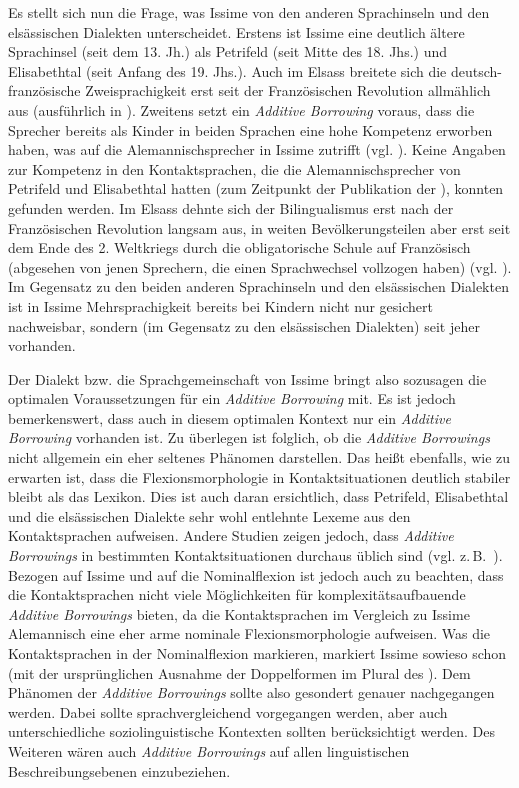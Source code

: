 Es stellt sich nun die Frage, was Issime von den anderen Sprachinseln und den elsässischen Dialekten unterscheidet. Erstens ist Issime eine deutlich ältere Sprachinsel (seit dem 13. Jh.) als Petrifeld (seit Mitte des 18. Jhs.) und Elisabethtal (seit Anfang des 19. Jhs.). Auch im Elsass breitete sich die deutsch-französische Zweisprachigkeit erst seit der Französischen Revolution allmählich aus (ausführlich in ). Zweitens setzt ein \textit{Additive Borrowing} voraus, dass die Sprecher bereits als Kinder in beiden Sprachen eine hohe Kompetenz erworben haben, was auf die Alemannischsprecher in Issime zutrifft (vgl. ). Keine Angaben zur Kompetenz in den Kontaktsprachen, die die Alemannischsprecher von Petrifeld und Elisabethtal hatten (zum Zeitpunkt der Publikation der ), konnten gefunden werden. Im Elsass dehnte sich der Bilingualismus erst nach der Französischen Revolution langsam aus, in weiten Bevölkerungsteilen aber erst seit dem Ende des 2. Weltkriegs durch die obligatorische Schule auf Französisch (abgesehen von jenen Sprechern, die einen Sprachwechsel vollzogen haben) (vgl. ). Im Gegensatz zu den beiden anderen Sprachinseln und den elsässischen Dialekten ist in Issime Mehrsprachigkeit bereits bei Kindern nicht nur gesichert nachweisbar, sondern (im Gegensatz zu den elsässischen Dialekten) seit jeher vorhanden.

Der Dialekt bzw. die Sprachgemeinschaft von Issime bringt also sozusagen die optimalen Voraussetzungen für ein \textit{Additive Borrowing} mit. Es ist jedoch bemerkenswert, dass auch in diesem optimalen Kontext nur ein \textit{Additive Borrowing} vorhanden ist. Zu überlegen ist folglich, ob die \textit{Additive Borrowings} nicht allgemein ein eher seltenes Phänomen darstellen. Das heißt ebenfalls, wie zu erwarten ist, dass die Flexionsmorphologie in Kontaktsituationen deutlich stabiler bleibt als das Lexikon. Dies ist auch daran ersichtlich, dass Petrifeld, Elisabethtal und die elsässischen Dialekte sehr wohl entlehnte Lexeme aus den Kontaktsprachen aufweisen. Andere Studien zeigen jedoch, dass \textit{Additive Borrowings} in bestimmten Kontaktsituationen durchaus üblich sind (vgl. z.\,B.\ \citealt{King2000}). Bezogen auf Issime und auf die Nominalflexion ist jedoch auch zu beachten, dass die Kontaktsprachen nicht viele Möglichkeiten für komplexitätsaufbauende \textit{Additive Borrowings} bieten, da die Kontaktsprachen im Vergleich zu Issime Alemannisch eine eher arme nominale Flexionsmorphologie aufweisen. Was die Kontaktsprachen in der Nominalflexion markieren, markiert Issime sowieso schon (mit der ursprünglichen Ausnahme der Doppelformen im Plural des ). Dem Phänomen der \textit{Additive Borrowings} sollte also gesondert genauer nachgegangen werden. Dabei sollte sprachvergleichend vorgegangen werden, aber auch unterschiedliche soziolinguistische Kontexten sollten berücksichtigt werden. Des Weiteren wären auch \textit{Additive Borrowings} auf allen linguistischen Beschreibungsebenen einzubeziehen.


